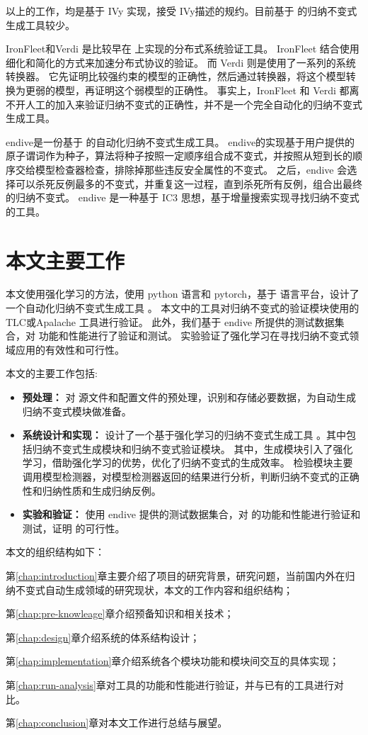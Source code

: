 以上的工作，均是基于 IVy 实现，接受 IVy描述的规约。目前基于 \TLA 的归纳不变式生成工具较少。

IronFleet\cite{IronFleet}和Verdi\cite{Verdi} 是比较早在 \TLA 上实现的分布式系统验证工具。
IronFleet 结合使用细化和简化的方式来加速分布式协议的验证。
而 Verdi 则是使用了一系列的系统转换器。
它先证明比较强约束的模型的正确性，然后通过转换器，将这个模型转换为更弱的模型，再证明这个弱模型的正确性。
事实上，IronFleet 和 Verdi 都离不开人工的加入来验证归纳不变式的正确性，并不是一个完全自动化的归纳不变式生成工具。

endive\cite{endive}是一份基于 \TLA 的自动化归纳不变式生成工具。
endive的实现基于用户提供的原子谓词作为种子，算法将种子按照一定顺序组合成不变式，并按照从短到长的顺序交给模型检查器检查，排除掉那些违反安全属性的不变式。
之后，endive 会选择可以杀死反例最多的不变式，并重复这一过程，直到杀死所有反例，组合出最终的归纳不变式。
endive 是一种基于 IC3 思想，基于增量搜索实现寻找归纳不变式的工具。

\section{本文主要工作}

本文使用强化学习的方法，使用 python 语言和 pytorch，基于 \TLA 语言平台，设计了一个自动化归纳不变式生成工具 \rltla。
本文中的工具对归纳不变式的验证模块使用的 TLC或Apalache 工具进行验证。
此外，我们基于 endive 所提供的测试数据集合，对 \rltla 功能和性能进行了验证和测试。
实验验证了强化学习在寻找归纳不变式领域应用的有效性和可行性。

本文的主要工作包括:
\begin{itemize}
    \item \textbf{预处理：} 对 \TLA 源文件和配置文件的预处理，识别和存储必要数据，为自动生成归纳不变式模块做准备。
    \item \textbf{系统设计和实现：} 设计了一个基于强化学习的归纳不变式生成工具 \rltla。其中包括归纳不变式生成模块和归纳不变式验证模块。
    其中，生成模块引入了强化学习，借助强化学习的优势，优化了归纳不变式的生成效率。
    检验模块主要调用模型检测器，对模型检测器返回的结果进行分析，判断归纳不变式的正确性和归纳性质和生成归纳反例。
    \item \textbf{实验和验证：} 使用 endive 提供的测试数据集合，对 \rltla 的功能和性能进行验证和测试，证明 \rltla 的可行性。
\end{itemize}

本文的组织结构如下：

第\ref{chap:introduction}章主要介绍了项目的研究背景，研究问题，当前国内外在归纳不变式自动生成领域的研究现状，本文的工作内容和组织结构；

第\ref{chap:pre-knowleage}章介绍预备知识和相关技术；

第\ref{chap:design}章介绍系统的体系结构设计；

第\ref{chap:implementation}章介绍系统各个模块功能和模块间交互的具体实现；

第\ref{chap:run-analysis}章对工具的功能和性能进行验证，并与已有的工具进行对比。

第\ref{chap:conclusion}章对本文工作进行总结与展望。

